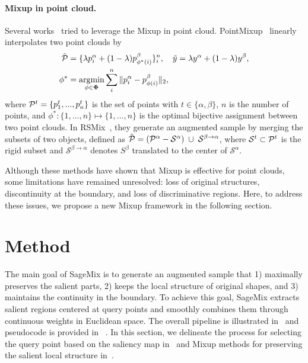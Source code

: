 \documentclass{article}
\begin{document}
\paragraph{Mixup in point cloud.} Several works~\cite{chen2020pointmixup, lee2021regularization} tried to leverage the Mixup in point cloud. PointMixup~\cite{chen2020pointmixup} linearly interpolates two point clouds by
\begin{align}
\tilde{\Point} &= \{\lambda\point^\alpha_i + (1-\lambda)\point^\beta_{\phi^\ast(i)}\}^n_i,\quad
\tilde{y} = \lambda y^\alpha + (1- \lambda)
y^\beta,
\label{eq:pointmixup}
\\
\phi^\ast &= \operatorname*{argmin}_{\phi \in \mathbf{\Phi}} \sum_i^n \|\point^\alpha_i - \point^\beta_{\phi(i)}\|_2,
\label{eq:OA}
\end{align}
where $\Point^t = \{p^t_1,...,p^t_n\}$ is the set of points with $t\in \{\alpha, \beta\}$, $n$ is the number of points, and $\phi^\ast : \{1,...,n\} \mapsto \{1,...,n\}$ is the optimal bijective assignment between two point clouds.
In RSMix~\cite{lee2021regularization}, they generate an augmented sample by merging the subsets of two objects, defined as $\tilde{\Point} =(\Point^\alpha - \mathcal{S}^\alpha) \; \cup \; \mathcal{S}^{\beta\rightarrow\alpha}$, where $\mathcal{S}^{t} \subset \Point^{t}$ is the rigid subset and $\mathcal{S} ^{\beta\rightarrow\alpha}$ denotes $S^\beta$ translated to the center of $\mathcal{S}^\alpha$. 

Although these methods have shown that Mixup is effective for point clouds, some limitations have remained unresolved: loss of original structures, discontinuity at the boundary, and loss of discriminative regions.
Here, to address these issues, we propose a new Mixup framework in the following section.
 \section{Method}
\label{sec:method}
The main goal of SageMix is to generate an augmented sample that 1) maximally preserves the salient parts, 2) keeps the local structure of original shapes, and 3) maintains the continuity in the boundary.
To achieve this goal, SageMix extracts salient regions centered at query points and smoothly combines them through continuous weights in Euclidean space. 
The overall pipeline is illustrated in~ and pseudocode is provided in~ . In this section, we delineate the process for selecting the query point based on the saliency map in~ and Mixup methods for preserving the salient local structure in~.
\end{document}
